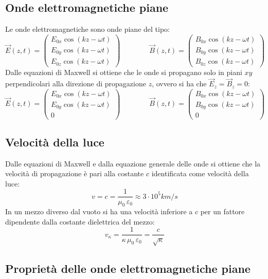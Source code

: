 \documentclass[a4paper]{article}
\begin{document}
\subsection{Onde elettromagnetiche piane}
Le onde elettromagnetiche sono onde piane del tipo:
\[\vec{E}(z,t) = \left(\begin{matrix} E_{0x} \cos (kz - \omega t) \\ E_{0y} \cos (kz - \omega t) \\ E_{0z} \cos (kz - \omega t) \end{matrix}\right) \qquad \qquad
\vec{B}(z,t) = \left(\begin{matrix} B_{0x} \cos (kz - \omega t) \\ B_{0y} \cos (kz - \omega t) \\ B_{0z} \cos (kz - \omega t) \end{matrix}\right)\]
Dalle equazioni di Maxwell si ottiene che le onde si propagano solo in piani \(xy\) perpendicolari alla direzione di
propagazione \(z\), ovvero si ha che \(\vec{E}_z = \vec{B}_z = 0\):
\[\vec{E}(z,t) = \left(\begin{matrix} E_{0x} \cos (kz - \omega t) \\ E_{0y} \cos (kz - \omega t) \\ 0 \end{matrix}\right) \qquad \qquad
\vec{B}(z,t) = \left(\begin{matrix} B_{0x} \cos (kz - \omega t) \\ B_{0y} \cos (kz - \omega t) \\ 0 \end{matrix}\right)\]

\subsection{Velocità della luce}
Dalle equazioni di Maxwell e dalla equazione generale delle onde si ottiene che la velocità di propagazione è pari alla costante 
\(c\) identificata come velocità della luce:
\[v = c = \frac{1}{\mu_0 \, \varepsilon_0} \approx 3 \cdot 10^5 km/s\]
In un mezzo diverso dal vuoto si ha una velocità inferiore a \(c\) per un fattore dipendente dalla costante dielettrica del mezzo:
\[v_\kappa = \frac{1}{\kappa \, \mu_0 \, \varepsilon_0} = \frac{c}{\sqrt{\kappa}}\]

\newpage

\subsection{Proprietà delle onde elettromagnetiche piane}
\end{document}
